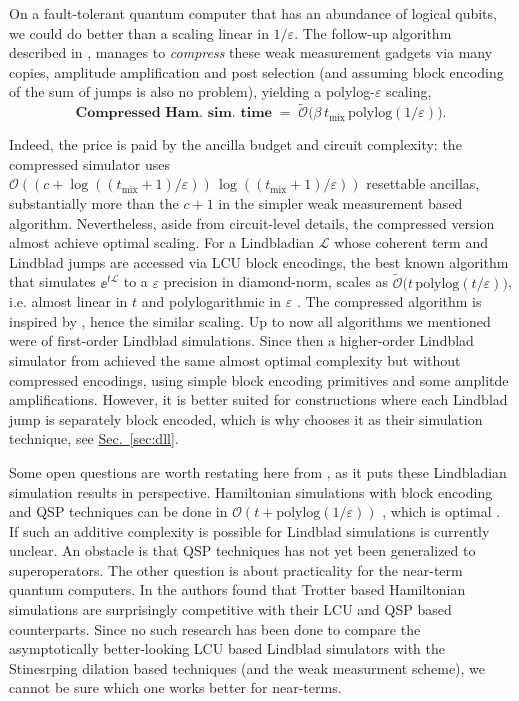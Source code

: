 On a fault-tolerant quantum computer that has an abundance of logical qubits, we could do better than a scaling linear in $1 / \varepsilon$. The follow-up algorithm described in \cite[Theorem~III.2]{chen2023quantum}, manages to \emph{compress} these weak measurement gadgets via many copies, amplitude amplification and post selection (and assuming block encoding of the sum of jumps is also no problem), yielding a polylog-$\varepsilon$ scaling,
\begin{equation} \label{eq:ckg-cost-compressed}
    \textbf{Compressed Ham. sim. time} \;=\; \tilde{\mathcal{O}}\!\bigl(\beta\,t_\text{mix}\,\mathrm{polylog}(1/\varepsilon)\bigr).
\end{equation}

Indeed, the price is paid by the ancilla budget and circuit complexity: the compressed simulator uses $\mathcal{O}((c + \log((t_\text{mix}+1)/\varepsilon))\,\log((t_\text{mix}+1)/\varepsilon))$ resettable ancillas, substantially more than the $c + 1$ in the simpler weak measurement based algorithm. Nevertheless, aside from circuit-level details, the compressed version almost achieve optimal scaling. For a Lindbladian $\mathcal{L}$ whose coherent term and Lindblad jumps are accessed via LCU block encodings, the best known algorithm that simulates $\ee^{t\mathcal{L}}$ to a $\varepsilon$ precision in diamond-norm, scales as $\tilde{\mathcal{O}}\bigl(t\,\mathrm{polylog}(t/\varepsilon)\bigr)$, i.e. almost linear in $t$ and polylogarithmic in $\varepsilon$ \cite{cleve2016efficient,li2022simulating}. The compressed algorithm is inspired by \cite{cleve2016efficient}, hence the similar scaling. Up to now all algorithms we mentioned were of first-order Lindblad simulations. Since then a higher-order Lindblad simulator from \cite{li2022simulating} achieved the same almost optimal complexity but without compressed encodings, using simple block encoding primitives and some amplitde amplifications. However, it is better suited for constructions where each Lindblad jump is separately block encoded, which is why \cite{ding2025efficient} chooses it as their simulation technique, see \hyperref[sec:dll]{Sec.~\ref*{sec:dll}}.

Some open questions are worth restating here from \cite{li2022simulating}, as it puts these Lindbladian simulation results in perspective. Hamiltonian simulations with block encoding and QSP techniques can be done in $\mathcal{O}(t + \text{polylog}(1 / \varepsilon))$ \cite{low2019hamiltonian}, which is optimal \cite{berry2015hamiltonian}. If such an additive complexity is possible for Lindblad simulations is currently unclear. An obstacle is that QSP techniques has not yet been generalized to superoperators. The other question is about practicality for the near-term quantum computers. 
In \cite{childs2018toward} the authors found that Trotter based Hamiltonian simulations are surprisingly competitive with their LCU and QSP based counterparts. Since no such research has been done to compare the asymptotically better-looking LCU based Lindblad simulators \cite{cleve2016efficient,li2022simulating} with the Stinesrping dilation based techniques \cite{childs2016efficient,kliesch2011dissipative} (and the weak measurment scheme), we cannot be sure which one works better for near-terms.

